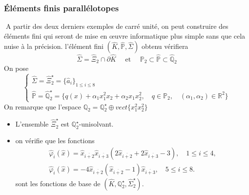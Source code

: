 \documentclass{beamer}
\begin{document}
\begin{frame}
\frametitle{Éléments finis parallélotopes}
A partir des deux derniers exemples de carré unité, 
on peut construire des éléments fini qui seront de mise en œuvre informatique 
plus simple sans que cela nuise à la précision. l'élément fini $(\widehat{K},\widehat{\mathbb{P}},\widehat{\Sigma})$ obtenu vérifiera
\[\widehat{\Sigma}=\widehat{\Xi}_2\cap \partial \widehat{K}\quad \mbox{ et }\quad\mathbb{P}_2 \subset \widehat{\mathbb{P}} \subset \widehat{\mathbb{Q}}_2\]
 On pose
\begin{equation}
\left\{
\begin{array}{l}
\widehat{\Sigma}=\widehat{\Xi}_2^\star=\{\hat{a}_i\}_{1\leq i\leq 8}\\
\widehat{\mathbb{P}}=\widehat{\mathbb{Q}}_2^\star=\{q(x)+\alpha_1x_1^2x_2+\alpha_2x_1x_2^2,\quad q\in\mathbb{P}_2,\quad (\alpha_1, \alpha_2)\in \mathbb{R}^2\}
\end{array} \right.
\end{equation}
On remarque que l'espace $\mathbb{Q}_2 = \mathbb{Q}_2^\star \oplus vect\{x_1^2x_2^2\}$%
\begin{itemize}
\item L'ensemble $\widehat{\Xi}_2^\star$ est $\mathbb{Q}_2^\star$-unisolvant.
\item on vérifie que les fonctions 
\begin{equation}
  \begin{array}{l}
  \hat{\varphi}_i(\hat{x})=\hat{x}_{\overline{i+2}} \hat{x}_{\overline{i+3}}  (2\hat{x}_{\overline{i+2}}+2\hat{x}_{\overline{i+3}}-3),\quad 1\leq i\leq 4,\\
  \hat{\varphi}_i(\hat{x})=-4\hat{x}_{\overline{i+2}}(\hat{x}_{\overline{i+2}}-1)\hat{x}_{\overline{i+3}},\quad 5\leq i\leq 8.
\end{array}              
\end{equation}
sont les fonctions de base de $(\widehat{K},\mathbb{Q}_2^\star,\widehat{\Sigma}_2^\star)$.
\end{itemize}
\end{frame}
\end{document}
